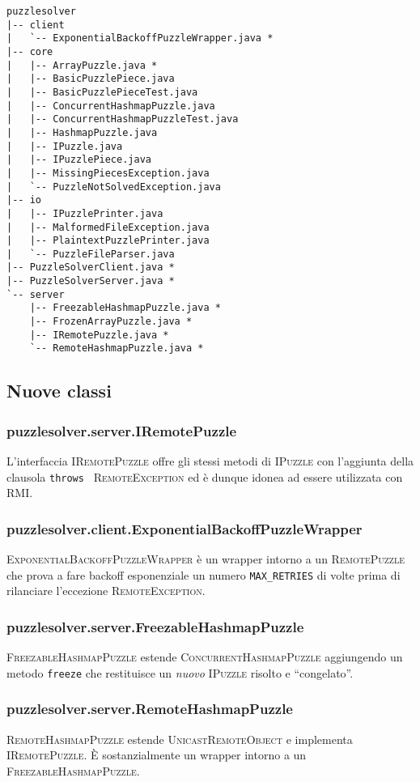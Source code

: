 \documentclass[a4paper]{article}
\newcommand{\Classname}[1]{\textsc{#1}}
\newcommand{\Ifacename}[1]{\textsc{#1}}
\newcommand{\Methodname}[1]{\texttt{#1}}
\begin{document}
\begin{verbatim}
puzzlesolver
|-- client
|   `-- ExponentialBackoffPuzzleWrapper.java *
|-- core
|   |-- ArrayPuzzle.java *
|   |-- BasicPuzzlePiece.java
|   |-- BasicPuzzlePieceTest.java
|   |-- ConcurrentHashmapPuzzle.java
|   |-- ConcurrentHashmapPuzzleTest.java
|   |-- HashmapPuzzle.java
|   |-- IPuzzle.java
|   |-- IPuzzlePiece.java
|   |-- MissingPiecesException.java
|   `-- PuzzleNotSolvedException.java
|-- io
|   |-- IPuzzlePrinter.java
|   |-- MalformedFileException.java
|   |-- PlaintextPuzzlePrinter.java
|   `-- PuzzleFileParser.java
|-- PuzzleSolverClient.java *
|-- PuzzleSolverServer.java *
`-- server
    |-- FreezableHashmapPuzzle.java *
    |-- FrozenArrayPuzzle.java *
    |-- IRemotePuzzle.java *
    `-- RemoteHashmapPuzzle.java *
\end{verbatim}

\subsection{Nuove classi}
\subsubsection{puzzlesolver.server.IRemotePuzzle}
L'interfaccia \Ifacename{IRemotePuzzle} offre gli stessi metodi di \Ifacename{IPuzzle} con l'aggiunta della clausola \texttt{throws } \Ifacename{RemoteException} ed \`e dunque idonea ad essere utilizzata con RMI.
\subsubsection{puzzlesolver.client.ExponentialBackoffPuzzleWrapper}
\Classname{ExponentialBackoffPuzzleWrapper} \`e un wrapper intorno a un \Ifacename{RemotePuzzle} che prova a fare backoff esponenziale un numero \texttt{MAX_RETRIES} di volte prima di rilanciare l'eccezione \Classname{RemoteException}.
\subsubsection{puzzlesolver.server.FreezableHashmapPuzzle}
\Classname{FreezableHashmapPuzzle} estende \Classname{ConcurrentHashmapPuzzle} aggiungendo un metodo \Methodname{freeze} che restituisce un \emph{nuovo} \Ifacename{IPuzzle} risolto e ``congelato''.
\subsubsection{puzzlesolver.server.RemoteHashmapPuzzle}
\Classname{RemoteHashmapPuzzle} estende \Classname{UnicastRemoteObject} e implementa \Classname{IRemotePuzzle}.
\`E sostanzialmente un wrapper intorno a un \Classname{FreezableHashmapPuzzle}.
\end{document}
